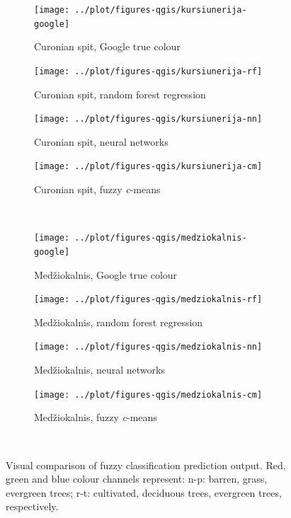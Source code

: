 \documentclass[a4paper,12pt]{scrbook}
\begin{document}
\begin{figure}
  \ContinuedFloat
  \centering
  \begin{subfigure}[t]{.23\textwidth}
    \texttt{[image: ../plot/figures-qgis/kursiunerija-google]}
    \caption{Curonian spit, Google true colour}
  \end{subfigure} \hfill
  \begin{subfigure}[t]{.23\textwidth}
    \texttt{[image: ../plot/figures-qgis/kursiunerija-rf]}
    \caption{Curonian spit, random forest regression}
    \label{subfig-kursiunerija-rf}
  \end{subfigure} \hfill
  \begin{subfigure}[t]{.23\textwidth}
    \texttt{[image: ../plot/figures-qgis/kursiunerija-nn]}
    \caption{Curonian spit, neural networks}
  \end{subfigure} \hfill
  \begin{subfigure}[t]{.23\textwidth}
    \texttt{[image: ../plot/figures-qgis/kursiunerija-cm]}
    \caption{Curonian spit, fuzzy \textit{c}-means}
    \label{subfig-kursiunerija-cm}
  \end{subfigure} \
  \begin{subfigure}[t]{.23\textwidth}
    \texttt{[image: ../plot/figures-qgis/medziokalnis-google]}
    \caption{Med\v{z}iokalnis, Google true colour}
  \end{subfigure} \hfill
  \begin{subfigure}[t]{.23\textwidth}
    \texttt{[image: ../plot/figures-qgis/medziokalnis-rf]}
    \caption{Med\v{z}iokalnis, random forest regression}
    \label{subfig-medziokalnis-rf}
  \end{subfigure} \hfill
  \begin{subfigure}[t]{.23\textwidth}
    \texttt{[image: ../plot/figures-qgis/medziokalnis-nn]}
    \caption{Med\v{z}iokalnis, neural networks}
  \end{subfigure} \hfill
  \begin{subfigure}[t]{.23\textwidth}
    \texttt{[image: ../plot/figures-qgis/medziokalnis-cm]}
    \caption{Med\v{z}iokalnis, fuzzy \textit{c}-means}
    \label{subfig-medziokalnis-cm}
  \end{subfigure} \
  \caption{Visual comparison of fuzzy classification prediction output. Red, green and blue colour channels represent: n-p: barren, grass, evergreen trees; r-t: cultivated, deciduous trees, evergreen trees, respectively.}
  \label{fig-visualcomparison}
\end{figure}
\end{document}
